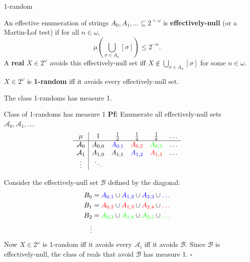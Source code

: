 \begin{frame}{1-random}
  \begin{define*}
    An effective enumeration of strings
    $A_0,A_1,\ldots \subseteq 2^{<\omega}$ is \textbf{effectively-null} (or a
    Martin-Lof test) if for all $n\in\omega$,
    \[\mu\left(\bigcup_{\sigma \in A_n} [\sigma] \right) \leq 2^{-n}.\]
    A \textbf{real} $X\in2^\omega$ avoids this effectively-null set iff
    $X\not\in \bigcup_{\sigma \in A_n} [\sigma]$ for some $n\in\omega$.
  \end{define*}

  \begin{define*}
    $X\in2^\omega$ is \textbf{1-random} iff it avoids every
    effectively-null set.
  \end{define*}

  \begin{thm*}
    The class 1-randoms has measure 1.
  \end{thm*}
\end{frame}

\begin{frame}{Class of 1-randoms has measure 1}
  \textbf{Pf:} Enumerate all effectively-null sets
  $\mathcal{A}_0,\mathcal{A}_1,\ldots$.
  \[\begin{array}{c|ccccc}
    \mu &1 &\frac{1}{2} &\frac{1}{4} &\frac{1}{8} &\ldots\\
    \hline
    \mathcal{A}_0 &A_{0,0} &\textcolor{blue}{A_{0,1}}
    &\textcolor{red}{A_{0,2}} &\textcolor{green}{A_{0,3}} &\ldots\\
    \mathcal{A}_1 &A_{1,0} &A_{1,1} &\textcolor{blue}{A_{1,2}}
    &\textcolor{red}{A_{1,3}} &\ldots\\
    \vdots &\ddots &&&&
  \end{array}\]

  Consider the effectively-null set $\mathcal{B}$ defined by the diagonal:
  \begin{align*}
    B_0&= \textcolor{blue}{A_{0,1}} \cup \textcolor{blue}{A_{1,2}} \cup
    \textcolor{blue}{A_{2,3}} \cup \textcolor{blue}{\ldots}\\
    B_1&= \textcolor{red}{A_{0,2}} \cup \textcolor{red}{A_{1,3}} \cup
    \textcolor{red}{A_{2,4}} \cup \textcolor{red}{\ldots}\\
    B_2&= \textcolor{green}{A_{0,3}} \cup \textcolor{green}{A_{1,4}} \cup
    \textcolor{green}{A_{2,5}} \cup \textcolor{green}{\ldots}\\
    \vdots&
  \end{align*}
  Now $X\in2^\omega$ is 1-random iff it avoids every $\mathcal{A}_i$ iff
  it avoids $\mathcal{B}$. Since $\mathcal{B}$ is effectively-null, the
  class of reals that avoid $\mathcal{B}$ has measure 1. $\square$
\end{frame}

